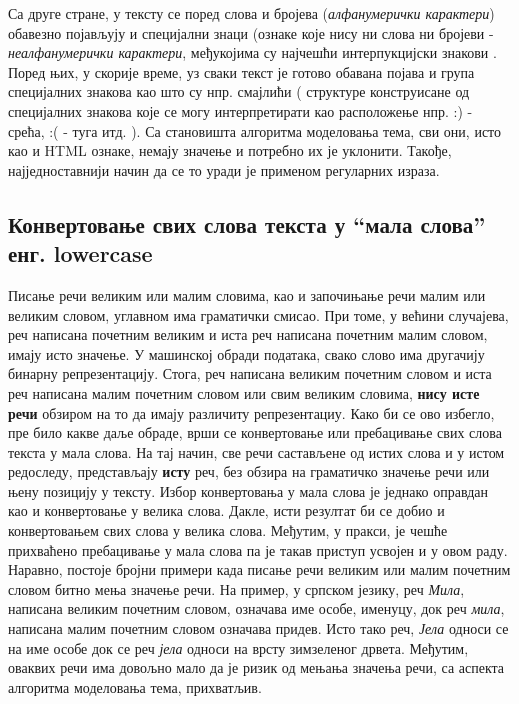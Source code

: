 Са друге стране, у тексту се поред слова и бројева (\textit{алфанумерички карактери}) обавезно појављују и специјални знаци (ознаке које нису ни слова ни бројеви - \textit{неалфанумерички карактери}, међукојима су најчешћи интерпукцијски знакови . Поред њих, у скорије време, уз сваки текст је готово обавана појава и група специјалних знакова као што су нпр. смајлићи ( структуре конструисане од специјалних знакова које се могу интерпретирати као расположење нпр. :) - срећа, :( - туга  итд. ). Са становишта алгоритма моделовања тема, сви они, исто као и HTML ознаке, немају значење и потребно их је уклонити. Такође, најједноставнији начин да се то уради је применом регуларних израза.

	\subsection{Конвертовање свих слова текста у "`мала слова"'  енг. lowercase }

Писање речи великим или малим словима, као и започињање речи малим или великим словом, углавном има граматички смисао. При томе, у већини случајева, реч написана почетним великим и иста реч написана почетним  малим словом, имају исто значење. У машинској обради података, свако слово има другачију бинарну репрезентацију. Стога, реч написана великим почетним словом и иста реч написана малим почетним словом или свим великим словима, \textbf{нису исте речи} обзиром на то да имају различиту репрезентациу. Како би се ово избегло, пре било какве даље обраде, врши се конвертовање или пребацивање свих слова текста у мала слова. На тај начин, све речи састављене од истих слова и у истом редоследу, представљају \textbf{исту} реч, без обзира на граматичко значење речи или њену позицију у тексту. Избор конвертовања у мала слова је једнако оправдан као и  конвертовање у велика слова. Дакле, исти резултат би се добио и конвертовањем свих слова у велика слова. Међутим, у пракси, је чешће прихваћено пребацивање у мала слова па је такав приступ усвојен и у овом раду.
Наравно, постоје бројни примери када писање речи великим или малим почетним словом битно мења значење речи. На пример, у српском језику, реч \textit{Мила}, написана великим почетним словом, означава име особе, именуцу, док реч \textit{мила}, написана малим почетним словом означава придев. Исто тако реч, \textit{Јела} односи се на име особе док се реч \textit{јела} односи на врсту зимзеленог дрвета. 
Међутим, оваквих речи има довољно мало да је ризик од мењања значења речи, са аспекта алгоритма моделовања тема, прихватљив.


